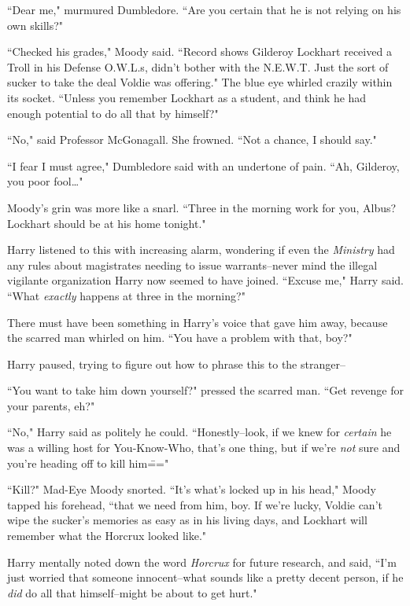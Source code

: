 ``Dear me," murmured Dumbledore. ``Are you certain that he is not relying on his own skills?"

``Checked his grades," Moody said. ``Record shows Gilderoy Lockhart received a Troll in his Defense O.W.L.s, didn't bother with the N.E.W.T. Just the sort of sucker to take the deal Voldie was offering." The blue eye whirled crazily within its socket. ``Unless you remember Lockhart as a student, and think he had enough potential to do all that by himself?"

``No," said Professor McGonagall. She frowned. ``Not a chance, I should say."

``I fear I must agree," Dumbledore said with an undertone of pain. ``Ah, Gilderoy, you poor fool{\ldots}"

Moody's grin was more like a snarl. ``Three in the morning work for you, Albus? Lockhart should be at his home tonight."

Harry listened to this with increasing alarm, wondering if even the \emph{Ministry} had any rules about magistrates needing to issue warrants\---never mind the illegal vigilante organization Harry now seemed to have joined. ``Excuse me," Harry said. ``What \emph{exactly} happens at three in the morning?"

There must have been something in Harry's voice that gave him away, because the scarred man whirled on him. ``You have a problem with that, boy?"

Harry paused, trying to figure out how to phrase this to the stranger\---

``You want to take him down yourself?" pressed the scarred man. ``Get revenge for your parents, eh?"

``No," Harry said as politely he could. ``Honestly\---look, if we knew for \emph{certain} he was a willing host for You-Know-Who, that's one thing, but if we're \emph{not} sure and you're heading off to kill him\==="

``Kill?" Mad-Eye Moody snorted. ``It's what's locked up in his head," Moody tapped his forehead, ``that we need from him, boy. If we're lucky, Voldie can't wipe the sucker's memories as easy as in his living days, and Lockhart will remember what the Horcrux looked like."

Harry mentally noted down the word \emph{Horcrux} for future research, and said, ``I'm just worried that someone innocent\---what sounds like a pretty decent person, if he \emph{did} do all that himself\---might be about to get hurt."

